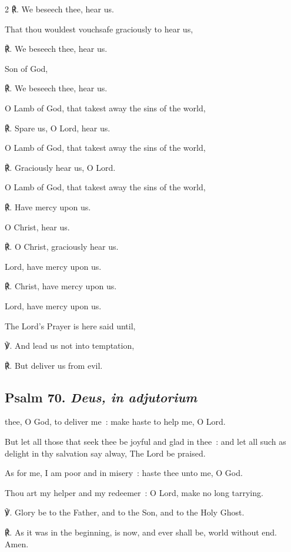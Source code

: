 \begin{multicols}{2}
℟. We beseech thee, hear us.\par\noindent
That thou wouldest vouchsafe graciously to hear us,\par
℟. We beseech thee, hear us.\par\noindent
Son of God,\par
℟. We beseech thee, hear us.\par\noindent
O Lamb of God, that takest away the sins of the world,\par
℟. Spare us, O Lord, hear us.\par\noindent
O Lamb of God, that takest away the sins of the world,\par
℟. Graciously hear us, O Lord.\par\noindent
O Lamb of God, that takest away the sins of the world,\par
℟. Have mercy upon us.\par\noindent
O Christ, hear us.\par
℟. O Christ, graciously hear us.\par\noindent
Lord, have mercy upon us.\par
℟. Christ, have mercy upon us.\par\noindent
Lord, have mercy upon us.
\end{multicols}

\begin{rubric}
    {The Lord's Prayer is here said until,}
\end{rubric}

℣. And lead us not into temptation,

℟. But deliver us from evil.

\subsection{Psalm 70. \textit{Deus, in adjutorium}}
 thee, O God, to deliver me~: make haste to help me, O Lord.\par
{}
But let all those that seek thee be joyful and glad in thee~: and let all such as delight in thy salvation say alway, The Lord be praised.\par
{}As for me, I am poor and in misery~: haste thee unto me, O God.\par
{}Thou art my helper and my redeemer~: O Lord, make no long tarrying.\par
℣. Glory be to the Father, and to the Son, and to the Holy Ghost.\par
℟. As it was in the beginning, is now, and ever shall be, world without end. Amen.

